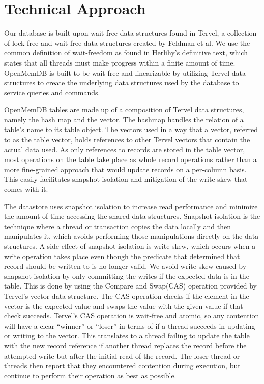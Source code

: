 \documentclass[conference, compsoc]{IEEEtran}
\begin{document}
\section{Technical Approach}
Our database is built upon wait-free data structures found in Tervel, a collection of
lock-free and wait-free data structures created by Feldman et al\cite{tervel:hazard_pointer}\cite{tervel:hash_map}\cite{tervel:vector}. 
We use the common definition of wait-freedom as found in Herlihy's definitive text, which
states that all threads must make progress within a finite amount of time\cite{herlihy:waitfree}. OpenMemDB is 
built to be wait-free and linearizable by utilizing Tervel data structures to create the 
underlying data structures used by the database to service queries and commands.
\par\vspace{\baselineskip}
OpenMemDB tables are made up of a composition of Tervel data structures, namely the hash map and the
vector. The hashmap handles the relation of a table's name to its table object. The vectors used in a
way that a vector, referred to as the table vector, holds references to other Tervel vectors that contain
the actual data used. As only references to records are stored in the table vector, most operations on the
table take place as whole record operations rather than a more fine-grained approach that would update
records on a per-column basis. This easily facilitates snapshot isolation and mitigation of the write skew
that comes with it.
\par\vspace{\baselineskip}
The datastore uses snapshot isolation to increase read performance and minimize the amount of time accessing
the shared data structures. Snapshot isolation is the technique where a thread or transaction copies the data
locally and then manipulates it, which avoids performing those manipulations directly on the data structures.
A side effect of snapshot isolation is write skew, which occurs when a write operation takes place even though the
predicate that determined that record should be written to is no longer valid.
We avoid write skew caused by snapshot isolation by only committing the writes
if the expected data is in the table. This is done by using the Compare and Swap(CAS) operation provided
by Tervel's vector data structure. The CAS operation checks if the element in the vector is the
expected value and swaps the value with the given value if that check succeeds. Tervel's CAS
operation is wait-free and atomic, so any contention will have a clear ``winner'' or ``loser'' in terms
of if a thread succeeds in updating or writing to the vector. This translates to a thread failing to update the
table with the new record reference if another thread replaces the record before the attempted write but 
after the initial read of the record.  The loser thread or threads then report that they encountered 
contention during execution, but continue to perform their operation as best as possible.
\end{document}
